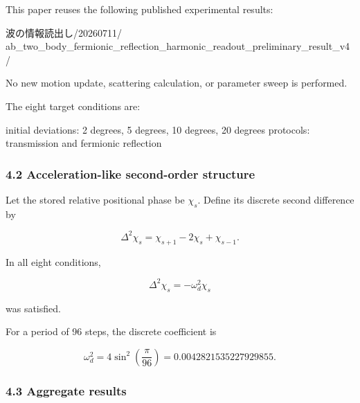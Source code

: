 \documentclass[
  a4paper,
]{article}
\newenvironment{Shaded}{}{}
\newcommand{\NormalTok}[1]{#1}
\begin{document}
This paper reuses the following published experimental results:

\begin{Shaded}
\begin{Highlighting}[]
\NormalTok{波の情報読出し/20260711/}
\NormalTok{ab\_two\_body\_fermionic\_reflection\_harmonic\_readout\_preliminary\_result\_v4/}
\end{Highlighting}
\end{Shaded}

No new motion update, scattering calculation, or parameter sweep is
performed.

The eight target conditions are:

\begin{Shaded}
\begin{Highlighting}[]
\NormalTok{initial deviations: 2 degrees, 5 degrees, 10 degrees, 20 degrees}
\NormalTok{protocols: transmission and fermionic reflection}
\end{Highlighting}
\end{Shaded}

\subsubsection{4.2 Acceleration-like second-order
structure}\label{acceleration-like-second-order-structure}

Let the stored relative positional phase be \(\chi_s\). Define its
discrete second difference by

\[
\Delta^2\chi_s
=\chi_{s+1}-2\chi_s+\chi_{s-1}.
\]

In all eight conditions,

\[
\Delta^2\chi_s
=-\omega_d^2\chi_s
\]

was satisfied.

For a period of 96 steps, the discrete coefficient is

\[
\omega_d^2
=4\sin^2\left(\frac{\pi}{96}\right)
=0.0042821535227929855.
\]

\subsubsection{4.3 Aggregate results}\label{aggregate-results}
\end{document}
